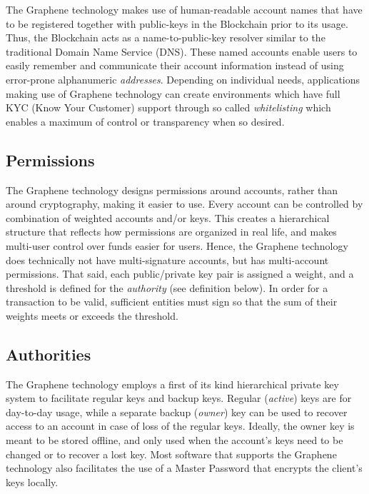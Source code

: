 The Graphene technology makes use of human-readable account names that have to be registered together with public-keys in the Blockchain prior to its usage.
Thus, the Blockchain acts as a name-to-public-key resolver similar to the traditional Domain Name Service (DNS). These named accounts enable users 
to easily remember and communicate their account information instead of using error-prone alphanumeric \emph{addresses}. Depending on individual needs, applications 
making use of Graphene technology can create environments which have full KYC (Know Your Customer) support through so 
called \emph{whitelisting} which enables a maximum of control or transparency when so desired.

\subsection{ Permissions }
The Graphene technology designs permissions around accounts, rather than around cryptography, making it easier to use. Every account can be controlled 
by combination of weighted accounts and/or keys. This creates a hierarchical structure that reflects how permissions are organized in real life, and 
makes multi-user control over funds easier for users. Hence, the Graphene technology does technically not have multi-signature accounts, but has multi-account permissions. 
That said, each public/private key pair is assigned a weight, and a threshold is defined for the \emph{authority} (see definition below). In order for a transaction 
to be valid, sufficient entities must sign so that the sum of their weights meets or exceeds the threshold.

\subsection{ Authorities }
The Graphene technology employs a first of its kind hierarchical private key system to facilitate regular keys and backup keys. Regular (\emph{active}) keys are 
for day-to-day usage, while a separate backup (\emph{owner}) key can be used to recover access to an account in case of loss of the regular keys. Ideally, the 
owner key is meant to be stored offline, and only used when the account's keys need to be changed or to recover a lost key. Most software that supports 
the Graphene technology also facilitates the use of a Master Password that encrypts the client's keys locally.
